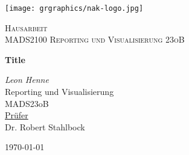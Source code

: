 \begin{titlepage}
	\centering
	\texttt{[image: grgraphics/nak-logo.jpg]}\par\vspace{1cm}
	\vspace{1cm}
	{\scshape\Large Hausarbeit \\ MADS2100 Reporting und Visualisierung 23oB\par}
	\vspace{1.5cm}
	{\huge\bfseries Title \par}
	\vspace{10mm}
	{\Large\itshape Leon Henne\\}
	\vspace{10mm}
  {\Large Reporting und Visualisierung \\ \vspace{1mm} \large MADS23oB}
  \vspace{20mm}\\
	\underline{Prüfer} \\
  \vspace{3mm}
	\large  Dr. Robert Stahlbock

	\vfill

	{\large \today\par}

\end{titlepage}